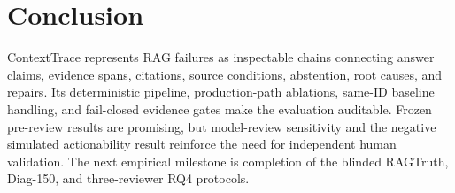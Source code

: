 \section{Conclusion}
ContextTrace represents RAG failures as inspectable chains connecting answer
claims, evidence spans, citations, source conditions, abstention, root causes,
and repairs. Its deterministic pipeline, production-path ablations, same-ID
baseline handling, and fail-closed evidence gates make the evaluation auditable.
Frozen pre-review results are promising, but model-review sensitivity and the
negative simulated actionability result reinforce the need for independent
human validation. The next empirical milestone is completion of the blinded
RAGTruth, Diag-150, and three-reviewer RQ4 protocols.
